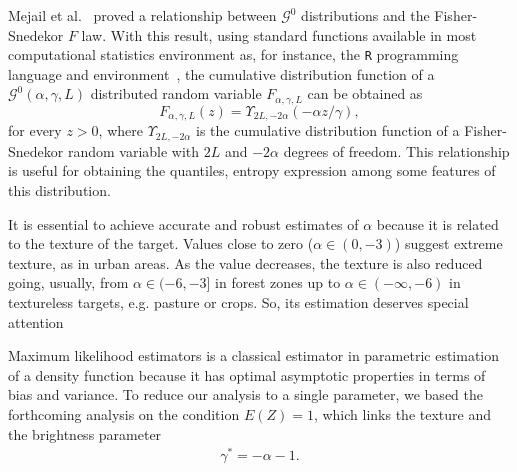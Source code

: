 \documentclass[twocolumn]{svjour3}
\begin{document}
	Mejail et al.~\cite{MejailJacoboFreryBustos:IJRS} proved a relationship between $\mathcal G^0$ distributions and the Fisher-Snedekor $F$ law.
	With this result, using standard functions available in most computational statistics environment as, for instance, the \texttt R programming language and environment~\cite{RLanguage}, the cumulative distribution function of a $\mathcal G^0(\alpha,\gamma,L)$ distributed random variable $F_{\alpha,\gamma,L}$ can be obtained as
	\begin{equation}
	F_{\alpha,\gamma,L}(z) = \Upsilon_{2L, -2\alpha}(-\alpha  z / \gamma),
	\label{eq:CDFG0}
	\end{equation}
	for every $z>0$, where $\Upsilon_{2L, -2\alpha}$ is the cumulative distribution function of a Fisher-Snedekor random variable with $2L$ and $-2\alpha$ degrees of freedom.
	This relationship is useful for obtaining the quantiles, entropy expression among some features of this distribution.
	
	It is essential to achieve accurate and robust estimates of $\alpha$ because it is related to the texture of the target. 
	Values close to zero ($\alpha \in (0,-3)$) suggest extreme texture, as in urban areas. 
	As the value decreases, the texture is also reduced going, usually, from $\alpha \in (-6,-3]$ in forest zones up to $\alpha\in(-\infty,-6)$ in textureless targets, e.g. pasture or crops. So, its estimation deserves special attention
	
		
	Maximum likelihood estimators is a classical estimator in parametric estimation of a density function because it has optimal asymptotic properties in terms of bias and variance. 
	To reduce our analysis to a single parameter, we based the forthcoming analysis on the condition $E(Z)=1$, which links the texture and the brightness parameter 
	\begin{align}
	\label{RelationAlphaGamma}
	\gamma^* =-\alpha-1.
	\end{align}
	
\end{document}
